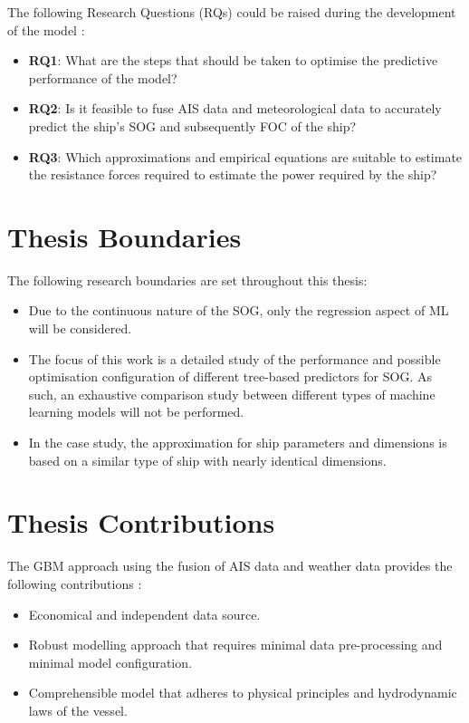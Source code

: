 \pagebreak

The following Research Questions (RQs) could be raised during the development of the model :

\begin{itemize}
    \item \textbf{RQ1}: What are the steps that should be taken to optimise the predictive performance of the model?
    \item \textbf{RQ2}: Is it feasible to fuse AIS data and meteorological data to accurately predict the ship's SOG and subsequently FOC of the ship?
    \item \textbf{RQ3}: Which approximations and empirical equations are suitable to estimate the resistance forces required to estimate the power required by the ship? 
\end{itemize} 

\section{Thesis Boundaries}\label{sec:boundaries}

The following research boundaries are set throughout this thesis:

\begin{itemize}
    \item Due to the continuous nature of the SOG, only the regression aspect of ML will be considered.
    \item The focus of this work is a detailed study of the performance and possible optimisation configuration of different tree-based predictors for SOG. As such, an exhaustive comparison study between different types of machine learning models will not be performed.
    \item In the case study, the approximation for ship parameters and dimensions is based on a similar type of ship with nearly identical dimensions. 
\end{itemize}

\section{Thesis Contributions}\label{sec:contributions}

The GBM approach using the fusion of AIS data and weather data provides the following contributions : 

\begin{itemize}
    \item Economical and independent data source.
    \item Robust modelling approach that requires minimal data pre-processing and minimal model configuration.
    \item Comprehensible model that adheres to physical principles and hydrodynamic laws of the vessel.  
\end{itemize} 

